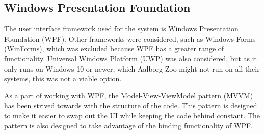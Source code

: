 \subsection{Windows Presentation Foundation} \label{ssc:tech_wpf}
The user interface framework used for the system is Windows Presentation Foundation (WPF). Other frameworks were considered, such as Windows Forms (WinForms), which was excluded because WPF has a greater range of functionality. Universal Windows Platform (UWP) was also considered, but as it only runs on Windows 10 or newer, which Aalborg Zoo might not run on all their systems, this was not a viable option.
\par
As a part of working with WPF, the Model-View-ViewModel pattern (MVVM) has been strived towards with the structure of the code. This pattern is designed to make it easier to swap out the UI while keeping the code behind constant. The pattern is also designed to take advantage of the binding functionality of WPF.